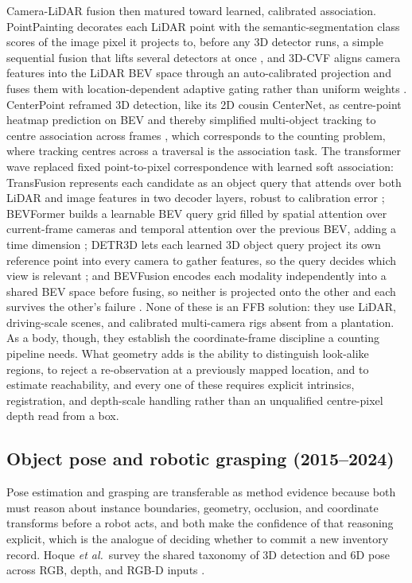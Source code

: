 Camera-LiDAR fusion then matured toward learned, calibrated association. PointPainting decorates each LiDAR point with the semantic-segmentation class scores of the image pixel it projects to, before any 3D detector runs, a simple sequential fusion that lifts several detectors at once \cite{vora2020pointpainting}, and 3D-CVF aligns camera features into the LiDAR BEV space through an auto-calibrated projection and fuses them with location-dependent adaptive gating rather than uniform weights \cite{yoo20203dcvf}. CenterPoint reframed 3D detection, like its 2D cousin CenterNet, as centre-point heatmap prediction on BEV and thereby simplified multi-object tracking to centre association across frames \cite{yin2021centerpoint}, which corresponds to the counting problem, where tracking centres across a traversal is the association task. The transformer wave replaced fixed point-to-pixel correspondence with learned soft association: TransFusion represents each candidate as an object query that attends over both LiDAR and image features in two decoder layers, robust to calibration error \cite{bai2022transfusion}; BEVFormer builds a learnable BEV query grid filled by spatial attention over current-frame cameras and temporal attention over the previous BEV, adding a time dimension \cite{li2022bevformer}; DETR3D lets each learned 3D object query project its own reference point into every camera to gather features, so the query decides which view is relevant \cite{wang2022detr3d}; and BEVFusion encodes each modality independently into a shared BEV space before fusing, so neither is projected onto the other and each survives the other's failure \cite{liu2023bevfusion}. None of these is an FFB solution: they use LiDAR, driving-scale scenes, and calibrated multi-camera rigs absent from a plantation. As a body, though, they establish the coordinate-frame discipline a counting pipeline needs. What geometry adds is the ability to distinguish look-alike regions, to reject a re-observation at a previously mapped location, and to estimate reachability, and every one of these requires explicit intrinsics, registration, and depth-scale handling rather than an unqualified centre-pixel depth read from a box.

\subsection{Object pose and robotic grasping (2015--2024)}

Pose estimation and grasping are transferable as method evidence because both must reason about instance boundaries, geometry, occlusion, and coordinate transforms before a robot acts, and both make the confidence of that reasoning explicit, which is the analogue of deciding whether to commit a new inventory record. Hoque \textit{et al.}\ survey the shared taxonomy of 3D detection and 6D pose across RGB, depth, and RGB-D inputs \cite{hoque2021posesurvey}.

